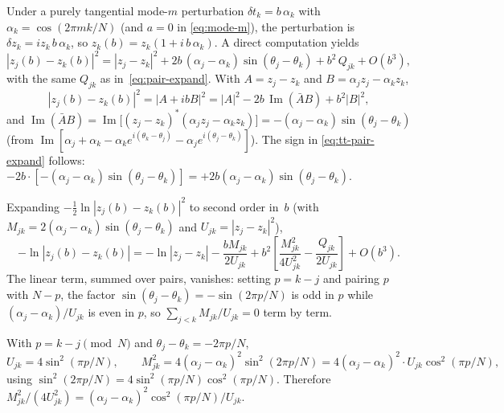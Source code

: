 \documentclass[11pt]{article}
\theoremstyle{remark}
\begin{document}
Under a purely tangential mode-$m$ perturbation
$\delta t_k = b\,\alpha_k$ with $\alpha_k = \cos(2\pi m k / N)$
(and $a = 0$ in \eqref{eq:mode-m}), the perturbation is
$\delta z_k = i z_k\,b\,\alpha_k$, so
$z_k(b) = z_k(1 + i\,b\,\alpha_k)$. A direct computation yields
\begin{equation}\label{eq:tt-pair-expand}
  |z_j(b) - z_k(b)|^2
   = |z_j - z_k|^2
     + 2b\,(\alpha_j - \alpha_k)\sin(\theta_j - \theta_k)
     + b^2\,Q_{jk} + O(b^3),
\end{equation}
with the same $Q_{jk}$ as in~\eqref{eq:pair-expand}. With
$A = z_j - z_k$ and $B = \alpha_j z_j - \alpha_k z_k$,
\[
  |z_j(b) - z_k(b)|^2 = |A + ibB|^2
    = |A|^2 - 2b\,\operatorname{Im}(\bar{A} B) + b^2 |B|^2,
\]
and $\operatorname{Im}(\bar{A} B)
 = \operatorname{Im}\!\bigl[(z_j - z_k)^{\!*}(\alpha_j z_j - \alpha_k z_k)\bigr]
 = -(\alpha_j - \alpha_k)\sin(\theta_j - \theta_k)$
(from $\operatorname{Im}[\alpha_j + \alpha_k - \alpha_k e^{i(\theta_k - \theta_j)} - \alpha_j e^{i(\theta_j - \theta_k)}]$).
The sign in \eqref{eq:tt-pair-expand} follows: $-2b \cdot [-(\alpha_j - \alpha_k)\sin(\theta_j - \theta_k)] = +2b(\alpha_j - \alpha_k)\sin(\theta_j - \theta_k)$.

Expanding $-\tfrac12 \ln|z_j(b) - z_k(b)|^2$ to second order in~$b$
(with $M_{jk} = 2(\alpha_j - \alpha_k)\sin(\theta_j - \theta_k)$
and $U_{jk} = |z_j - z_k|^2$),
\[
  -\ln|z_j(b) - z_k(b)|
   = -\ln|z_j - z_k|
     - \frac{b M_{jk}}{2 U_{jk}}
     + b^2\!\left[\frac{M_{jk}^2}{4 U_{jk}^2}
                   - \frac{Q_{jk}}{2 U_{jk}}\right] + O(b^3).
\]
The linear term, summed over pairs, vanishes: setting $p = k - j$ and
pairing $p$ with $N - p$, the factor $\sin(\theta_j - \theta_k) = -\sin(2\pi p / N)$
is odd in $p$ while $(\alpha_j - \alpha_k)/U_{jk}$ is even in $p$, so
$\sum_{j<k} M_{jk}/U_{jk} = 0$ term by term.

With $p = k - j \pmod N$ and $\theta_j - \theta_k = -2\pi p / N$,
\[
  U_{jk} = 4 \sin^2(\pi p / N),
  \qquad
  M_{jk}^2 = 4(\alpha_j - \alpha_k)^2 \sin^2(2\pi p / N)
           = 4(\alpha_j - \alpha_k)^2 \cdot U_{jk} \cos^2(\pi p / N),
\]
using $\sin^2(2\pi p / N) = 4 \sin^2(\pi p / N) \cos^2(\pi p / N)$.
Therefore $M_{jk}^2 / (4 U_{jk}^2) = (\alpha_j - \alpha_k)^2
\cos^2(\pi p / N) / U_{jk}$.
\end{document}
